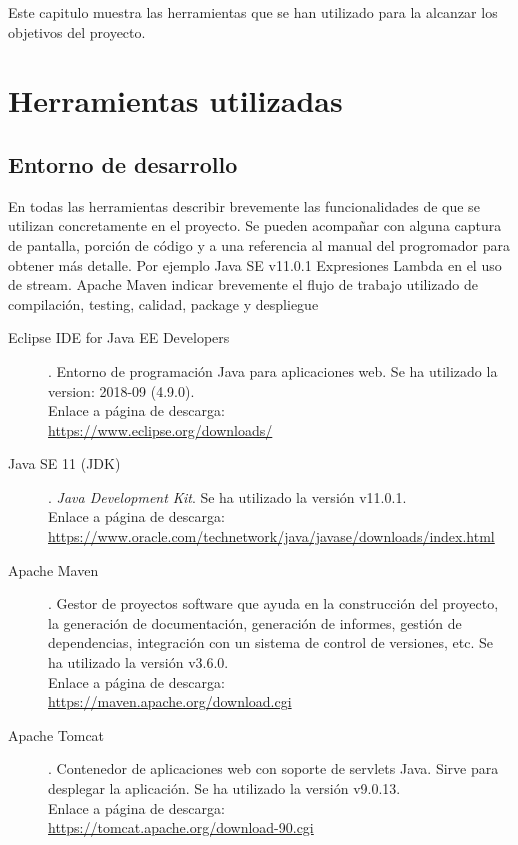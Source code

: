 
Este capitulo muestra las herramientas que se han utilizado para la alcanzar los objetivos del proyecto.
\section{Herramientas utilizadas}
\subsection{Entorno de desarrollo}
\todo En todas las herramientas describir brevemente las funcionalidades de que se utilizan concretamente en el proyecto.
\todo Se pueden acompañar con alguna captura de pantalla, porción de código y a una referencia al manual del progromador para obtener más detalle.
\todo Por ejemplo Java SE v11.0.1 Expresiones Lambda en el uso de stream. 
 \todo Apache Maven indicar brevemente el  flujo de trabajo utilizado de compilación, testing, calidad, package y despliegue 
\begin{description}
	\item[Eclipse IDE for Java EE Developers]. Entorno de programación Java para aplicaciones web. Se ha utilizado la version: 2018-09 (4.9.0).\\ Enlace a página de descarga:\\ \url{https://www.eclipse.org/downloads/}
	\item[Java SE 11 (JDK)]. \textit{Java Development Kit}. Se ha utilizado la versión  v11.0.1.\\ Enlace a página de descarga:\\ \url{https://www.oracle.com/technetwork/java/javase/downloads/index.html}
	\item[Apache Maven]. Gestor de proyectos software que ayuda en la construcción del proyecto, la generación de documentación, generación de informes, gestión de dependencias, integración con un sistema de control de versiones, etc. Se ha utilizado la versión  v3.6.0.\\ Enlace a página de descarga:\\ \url{https://maven.apache.org/download.cgi}
	\item[Apache Tomcat]. Contenedor de aplicaciones web con soporte de servlets Java. Sirve para desplegar la aplicación. Se ha utilizado la versión  v9.0.13.\\ Enlace a página de descarga:\\ \url{https://tomcat.apache.org/download-90.cgi}
\end{description}
